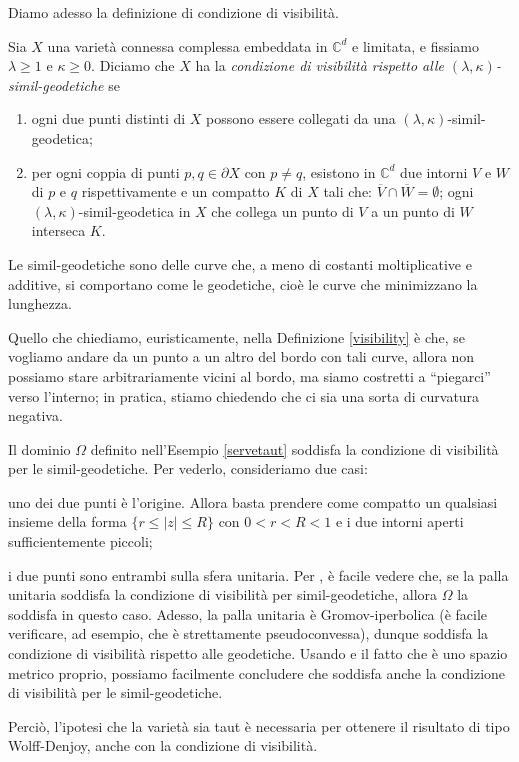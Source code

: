 Diamo adesso la definizione di condizione di visibilità.

\begin{defn} \label{visibility}
    Sia $X$ una varietà connessa complessa embeddata in $\mathbb{C}^d$ e limitata, e fissiamo $\lambda \ge 1$ e $\kappa \ge 0$. Diciamo che $X$ ha la \textit{condizione di visibilità rispetto alle $(\lambda,\kappa)$-simil-geodetiche} se
    \begin{enumerate}
        \item ogni due punti distinti di $X$ possono essere collegati da una $(\lambda,\kappa)$-simil-geodetica;
        \item per ogni coppia di punti $p,q\in\partial X$ con $p\not=q$, esistono in $\mathbb{C}^d$ due intorni $V$ e $W$ di $p$ e $q$ rispettivamente e un compatto $K$ di $X$ tali che: $\overline{V}\cap\overline{W}=\emptyset$; ogni $(\lambda,\kappa)$-simil-geodetica in $X$ che collega un punto di $V$ a un punto di $W$ interseca $K$.
    \end{enumerate}
\end{defn}

Le simil-geodetiche sono delle curve che, a meno di costanti moltiplicative e additive, si comportano come le geodetiche, cioè le curve che minimizzano la lunghezza.

Quello che chiediamo, euristicamente, nella Definizione \ref{visibility} è che, se vogliamo andare da un punto a un altro del bordo con tali curve, allora non possiamo stare arbitrariamente vicini al bordo, ma siamo costretti a ``piegarci'' verso l'interno; in pratica, stiamo chiedendo che ci sia una sorta di curvatura negativa.

\begin{ftt}
    Il dominio $\Omega$ definito nell'Esempio \ref{servetaut} soddisfa la condizione di visibilità per le simil-geodetiche. Per vederlo, consideriamo due casi:
    \begin{nlist}
        \item uno dei due punti è l'origine. Allora basta prendere come compatto un qualsiasi insieme della forma $\{r \le |z| \le R\}$ con $0<r<R<1$ e i due intorni aperti sufficientemente piccoli;
        \item i due punti sono entrambi sulla sfera unitaria. Per \cite[Proposition 6]{NTT}, è facile vedere che, se la palla unitaria soddisfa la condizione di visibilità per simil-geodetiche, allora $\Omega$ la soddisfa in questo caso. Adesso, la palla unitaria è Gromov-iperbolica (è facile verificare, ad esempio, che è strettamente pseudoconvessa), dunque soddisfa la condizione di visibilità rispetto alle geodetiche. Usando \cite[Part III, Chapter H, Paragraph 1, Theorem 1.7]{BH} e il fatto che è uno spazio metrico proprio, possiamo facilmente concludere che soddisfa anche la condizione di visibilità per le simil-geodetiche.
    \end{nlist}
    Perciò, l'ipotesi che la varietà sia taut è necessaria per ottenere il risultato di tipo Wolff-Denjoy, anche con la condizione di visibilità.
\end{ftt}